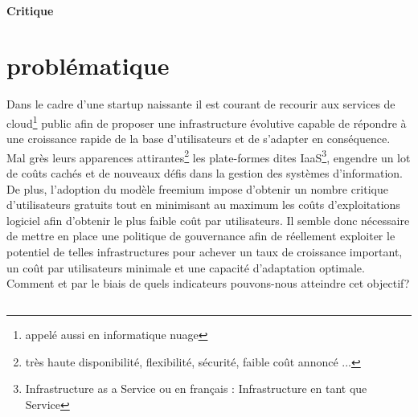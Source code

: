 \documentclass[11pt, a4paper ]{article}
\let\stdsection\section
\renewcommand\section{\newpage\stdsection}
\begin{document}
\begin{spacing}{1.5}
		\paragraph{Critique}


		\section{problématique} %



Dans le cadre d'une startup naissante il est courant de recourir aux services de cloud\footnote{appelé aussi en informatique nuage} public afin de proposer une infrastructure évolutive capable de répondre à une croissance rapide de la base d'utilisateurs et de s'adapter en conséquence.
Mal grès leurs apparences attirantes\footnote{très haute disponibilité, flexibilité, sécurité, faible coût annoncé ...} les plate-formes dites IaaS\footnote{Infrastructure as a Service ou en français : Infrastructure en tant que Service}, engendre un lot de coûts cachés et de nouveaux défis dans la gestion des systèmes d'information.
De plus, l'adoption du modèle freemium impose d'obtenir un nombre critique d'utilisateurs gratuits tout en minimisant au maximum les coûts d'exploitations logiciel afin d'obtenir le plus faible coût par utilisateurs.
Il semble donc nécessaire de mettre en place une politique de gouvernance afin de réellement exploiter le potentiel de telles infrastructures pour achever un taux de croissance important, un coût par utilisateurs minimale et une capacité d'adaptation optimale. Comment et par le biais de quels indicateurs pouvons-nous atteindre cet objectif?


			\subsection*{}


\end{spacing}
\end{document}

